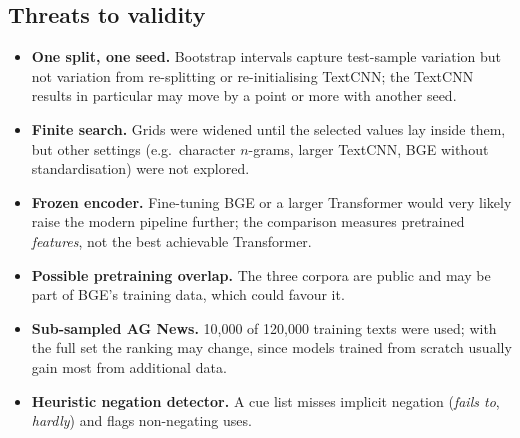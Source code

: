 \subsection{Threats to validity}
\begin{itemize}
  \item \textbf{One split, one seed.} Bootstrap intervals capture test-sample variation but not variation from re-splitting or re-initialising TextCNN; the TextCNN results in particular may move by a point or more with another seed.
  \item \textbf{Finite search.} Grids were widened until the selected values lay inside them, but other settings (e.g.\ character $n$-grams, larger TextCNN, BGE without standardisation) were not explored.
  \item \textbf{Frozen encoder.} Fine-tuning BGE or a larger Transformer would very likely raise the modern pipeline further; the comparison measures pretrained \emph{features}, not the best achievable Transformer.
  \item \textbf{Possible pretraining overlap.} The three corpora are public and may be part of BGE's training data, which could favour it.
  \item \textbf{Sub-sampled AG News.} 10{,}000 of 120{,}000 training texts were used; with the full set the ranking may change, since models trained from scratch usually gain most from additional data.
  \item \textbf{Heuristic negation detector.} A cue list misses implicit negation (\textit{fails to}, \textit{hardly}) and flags non-negating uses.
\end{itemize}
